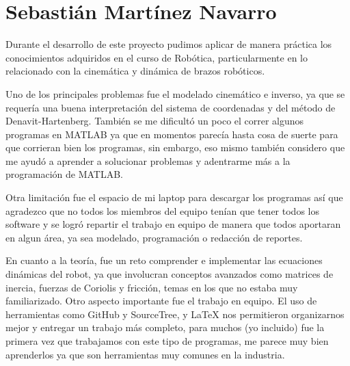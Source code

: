 \section{Sebastián Martínez Navarro}
Durante el desarrollo de este proyecto pudimos aplicar de manera práctica los conocimientos adquiridos en el curso de Robótica, particularmente en lo relacionado con la cinemática y dinámica de brazos robóticos.

Uno de los principales problemas fue el modelado cinemático e inverso, ya que se requería una buena interpretación del sistema de coordenadas y del método de Denavit-Hartenberg. También se me dificultó un poco el correr algunos programas en MATLAB ya que en momentos parecía hasta cosa de suerte para que corrieran bien los programas, sin embargo, eso mismo también considero que me ayudó a aprender a solucionar problemas y adentrarme más a la programación de MATLAB.

Otra limitación fue el espacio de mi laptop para descargar los programas así que agradezco que no todos los miembros del equipo tenían que tener todos los software y se logró repartir el trabajo en equipo de manera que todos aportaran en algun área, ya sea modelado, programación o redacción de reportes.

En cuanto a la teoría, fue un reto comprender e implementar las ecuaciones dinámicas del robot, ya que involucran conceptos avanzados como matrices de inercia, fuerzas de Coriolis y fricción, temas en los que no estaba muy familiarizado. 
Otro aspecto importante fue el trabajo en equipo. El uso de herramientas como GitHub y SourceTree, y LaTeX nos permitieron organizarnos mejor y entregar un trabajo más completo, para muchos (yo incluido) fue la primera vez que trabajamos con este tipo de programas, me parece muy bien aprenderlos ya que son herramientas muy comunes en la industria.

